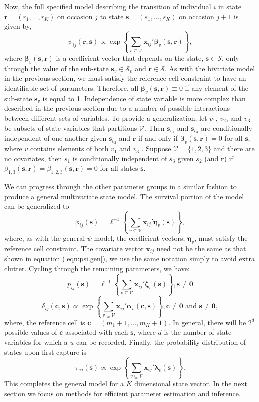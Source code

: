 \documentclass[sts]{imsart}
\numberwithin{equation}{section}
\theoremstyle{plain}
\newcommand{\bs}{\ensuremath{\mathbf{s}}}
\newcommand{\bc}{\ensuremath{\mathbf{c}}}
\newcommand{\fS}{\ensuremath{\mathcal{S}}}
\newcommand{\br}{\ensuremath{\mathbf{r}}}
\newcommand{\fV}{\ensuremath{\mathcal{V}}}
\newcommand{\bx}{\ensuremath{\mathbf{x}}}
\newcommand{\bb}{\ensuremath{\boldsymbol{\beta}}}
\newcommand{\ba}{\ensuremath{\boldsymbol{\alpha}}}
\newcommand{\bl}{\ensuremath{\boldsymbol{\lambda}}}
\newcommand{\bn}{\ensuremath{\boldsymbol{\eta}}}
\newcommand{\bz}{\ensuremath{\boldsymbol{\zeta}}}
\newcommand{\bzero}{\ensuremath{\mathbf{0}}}
\begin{document}
Now, the full specified model describing the transition of individual $i$ in state $\br = (r_1,\dots,r_K)$ on occasion $j$ to state $\bs=(s_1,\dots,s_K)$ on occasion $j+1$ is given by,
\begin{equation}
\label{eqn:psi.gen}
\psi_{ij}(\br,\bs) \propto \exp\left\{ \sum_{v\subseteq\fV}\bx_{ij}'\bb_v(\bs,\br)\right\},
\end{equation}
where $\bb_v(\bs,\br)$ is a coefficient vector that depends on the state, $\bs\in\fS$, only through the value of the sub-state $\bs_v\in\fS_v$ and $\br\in\fS$. As with the bivariate model in the previous section, we must satisfy the reference cell constraint to have an identifiable set of parameters. Therefore, all $\bb_v(\bs,\br) \equiv 0$ if any element of the sub-state $\bs_v$ is equal to 1. Independence of state variable is more complex than described in the previous section due to a number of possible interactions between different sets of variables. To provide a generalization, let $v_1$, $v_2$, and $v_3$ be subsets of state variables that partitions $\fV$. Then $\bs_{v_1}$ and $\bs_{v_3}$ are conditionally independent of one another given $\bs_{v_2}$ and $\br$ if and only if $\bb_v(\bs,\br) = 0$ for all $\bs$, where $v$ contains elements of both $v_1$ and $v_3$ \citep{Johnson:2003bh}. Suppose $\fV=\{1,2,3\}$ and there are no covariates, then $s_1$ is conditionally independent of $s_3$ given $s_2$ (and $\br$) if $\beta_{1,3}(\bs,\br) = \beta_{1,2,3}(\bs,\br)=0$ for all states $\bs$. 

We can progress through the other parameter groups in a similar fashion to produce a general multivariate state model. The survival portion of the model can be generalized to 
\begin{equation}
\phi_{ij}(\bs) = \ell^{-1}\left\{ \sum_{v\subseteq\fV}\bx_{ij}'\bn_v(\bs)\right\},
\end{equation}
where, as with the general $\psi$ model, the coefficient vectors, $\bn_v$, must satisfy the reference cell constraint. The covariate vector $\bx_{ij}$ need not be the same as that shown in equation (\ref{eqn:psi.gen}), we use the same notation simply to avoid extra clutter. Cycling through the remaining parameters, we have:
\begin{equation}
p_{ij}(\bs) = \ell^{-1}\left\{ \sum_{v\subseteq\fV}\bx_{ij}'\bz_v(\bs)\right\}, \bs \ne \bzero
\end{equation}
\begin{equation}
\delta_{ij}(\bc,\bs) \propto \exp\left\{ \sum_{v\subseteq\fV}\bx_{ij}'\ba_v(\bc,\bs)\right\}, \bc \ne \bzero \mbox{ and } \bs \ne \bzero,
\end{equation}
where, the reference cell is $\bc=(m_1+1,\dots,m_K+1)$. In general, there will be $2^d$ possible values of $\bc$ associated with each $\bs$, where $d$ is the number of state variables for which a $u$ can be recorded. Finally, the probability distribution of states upon first capture is
\begin{equation}
\pi_{ij}(\bs)\propto \exp\left\{ \sum_{v\subseteq\fV}\bx_{ij}'\bl_v(\bs)\right\}.
\end{equation}  
This completes the general model for a $K$ dimensional state vector. In the next section we focus on methods for efficient parameter estimation and inference. 
 
\end{document}
